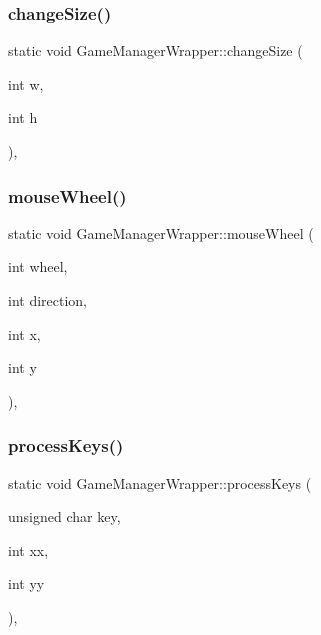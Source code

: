 \subsubsection{\texorpdfstring{change\+Size()}{changeSize()}}
{\footnotesize\ttfamily static void Game\+Manager\+Wrapper\+::change\+Size (\begin{DoxyParamCaption}\item[{int}]{w,  }\item[{int}]{h }\end{DoxyParamCaption})\hspace{0.3cm}{\ttfamily [inline]}, {\ttfamily [static]}}

\mbox{\label{struct_game_manager_wrapper_adfc80e5152ed245983e175a570a2c803}} 
\subsubsection{\texorpdfstring{mouse\+Wheel()}{mouseWheel()}}
{\footnotesize\ttfamily static void Game\+Manager\+Wrapper\+::mouse\+Wheel (\begin{DoxyParamCaption}\item[{int}]{wheel,  }\item[{int}]{direction,  }\item[{int}]{x,  }\item[{int}]{y }\end{DoxyParamCaption})\hspace{0.3cm}{\ttfamily [inline]}, {\ttfamily [static]}}

\mbox{\label{struct_game_manager_wrapper_a22481b9f1883dbedf4471622261b6530}} 
\subsubsection{\texorpdfstring{process\+Keys()}{processKeys()}}
{\footnotesize\ttfamily static void Game\+Manager\+Wrapper\+::process\+Keys (\begin{DoxyParamCaption}\item[{unsigned char}]{key,  }\item[{int}]{xx,  }\item[{int}]{yy }\end{DoxyParamCaption})\hspace{0.3cm}{\ttfamily [inline]}, {\ttfamily [static]}}

